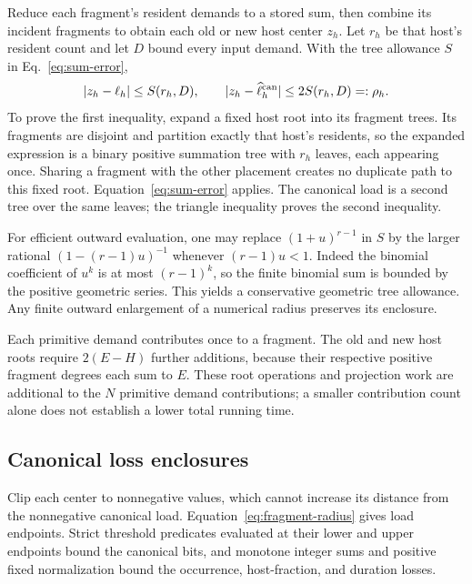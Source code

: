 \documentclass[11pt]{article}
\begin{document}
Reduce each fragment's resident demands to a stored sum, then combine its incident fragments to obtain each old or new host center $z_h$. Let $r_h$ be that host's resident count and let $D$ bound every input demand. With the tree allowance $S$ in Eq.~\eqref{eq:sum-error},
\begin{equation}
|z_h-\ell_h|\le S(r_h,D),\qquad
|z_h-\widehat\ell_h^{\rm can}|\le2S(r_h,D)=:\rho_h.
\label{eq:fragment-radius}
\end{equation}
To prove the first inequality, expand a fixed host root into its fragment trees. Its fragments are disjoint and partition exactly that host's residents, so the expanded expression is a binary positive summation tree with $r_h$ leaves, each appearing once. Sharing a fragment with the other placement creates no duplicate path to this fixed root. Equation~\eqref{eq:sum-error} applies. The canonical load is a second tree over the same leaves; the triangle inequality proves the second inequality.

For efficient outward evaluation, one may replace $(1+u)^{r-1}$ in $S$ by the larger rational $(1-(r-1)u)^{-1}$ whenever $(r-1)u<1$. Indeed the binomial coefficient of $u^k$ is at most $(r-1)^k$, so the finite binomial sum is bounded by the positive geometric series. This yields a conservative geometric tree allowance. Any finite outward enlargement of a numerical radius preserves its enclosure.

Each primitive demand contributes once to a fragment. The old and new host roots require $2(E-H)$ further additions, because their respective positive fragment degrees each sum to $E$. These root operations and projection work are additional to the $N$ primitive demand contributions; a smaller contribution count alone does not establish a lower total running time.

\subsection{Canonical loss enclosures}
Clip each center to nonnegative values, which cannot increase its distance from the nonnegative canonical load. Equation~\eqref{eq:fragment-radius} gives load endpoints. Strict threshold predicates evaluated at their lower and upper endpoints bound the canonical bits, and monotone integer sums and positive fixed normalization bound the occurrence, host-fraction, and duration losses.
\end{document}
